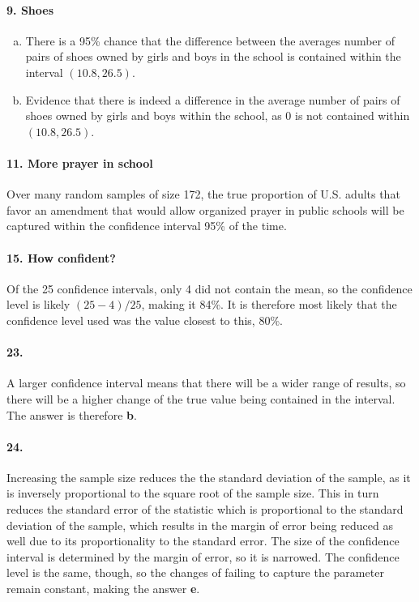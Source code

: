 \documentclass[12pt, A4]{article}
\begin{document}
		\paragraph{9. Shoes}
			\begin{enumerate}[a.]
				\item
					There is a 95\% chance that the difference between the averages number of pairs of shoes owned by girls and boys in the school is contained within the interval $(10.8, 26.5)$.
				\item
					Evidence that there is indeed a difference in the average number of pairs of shoes owned by girls and boys within the school, as 0 is not contained within $(10.8, 26.5)$.
			\end{enumerate}
		\paragraph{11. More prayer in school}
			Over many random samples of size 172, the true proportion of U.S. adults that favor an amendment that would allow organized prayer in public schools will be captured within the confidence interval 95\% of the time.
		\paragraph{15. How confident?}
			Of the 25 confidence intervals, only 4 did not contain the mean, so the confidence level is likely $(25 - 4)/25$, making it 84\%. It is therefore most likely that the confidence level used was the value closest to this, 80\%.
		\paragraph{23.} 
			A larger confidence interval means that there will be a wider range of results, so there will be a higher change of the true value being contained in the interval. The answer is therefore \textbf{b}.
		\paragraph{24.} 
			Increasing the sample size reduces the the standard deviation of the sample, as it is inversely proportional to the square root of the sample size. This in turn reduces the standard error of the statistic which is proportional to the standard deviation of the sample, which results in the margin of error being reduced as well due to its proportionality to the standard error. The size of the confidence interval is determined by the margin of error, so it is narrowed. The confidence level is the same, though, so the changes of failing to capture the parameter remain constant, making the answer \textbf{e}.		
\end{document}
